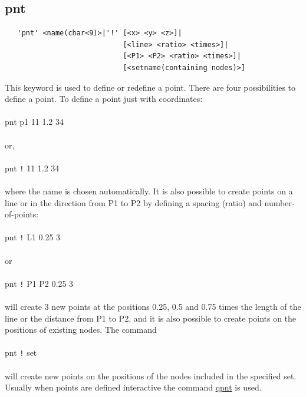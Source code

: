 \documentclass{article}
\providecommand{\htmlref}[2]{\hyperref[#2]{#1}}
\begin{document}
\subsection{\label{pnt}pnt}
\begin{verbatim}
   'pnt' <name(char<9)>|'!' [<x> <y> <z>]|
                            [<line> <ratio> <times>]|
                            [<P1> <P2> <ratio> <times>]|
                            [<setname(containing nodes)>] 
\end{verbatim}
This keyword is used to define or redefine a point. There are four possibilities to define a point. To define a point just with coordinates:\\\\
pnt p1 11 1.2 34\\\\or,\\\\
pnt \verb_!_ 11 1.2 34\\\\where the name is chosen automatically. It is also possible to create points on a line or in the direction from P1 to P2 by defining a spacing (ratio) and number-of-points:\\\\
pnt \verb_!_ L1 0.25 3\\\\or\\\\
pnt \verb_!_ P1 P2 0.25 3\\\\will create 3 new points at the positions 0.25, 0.5 and 0.75 times the length of the line or the distance from P1 to P2, and it is also possible to create points on the positions of existing nodes. The command\\\\
pnt \verb_!_ set\\\\will create new points on the positions of the nodes included in the specified set. Usually when points are defined interactive the command \htmlref{qpnt}{qpnt} is used.
 
\end{document}
